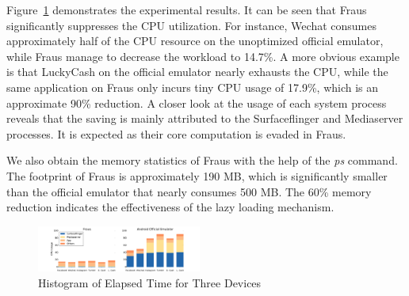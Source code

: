 \documentclass[conference]{IEEEtranl}
\begin{document}
	Figure~\ref{fig:cpusaving} demonstrates the experimental results. It can be seen that 
	Fraus significantly suppresses the CPU utilization. For instance, Wechat consumes approximately half of the CPU resource on the unoptimized official emulator, while Fraus manage to decrease the workload to 14.7\%. A more obvious example is that LuckyCash on the official emulator nearly exhausts the CPU, while the same application on Fraus only incurs tiny CPU usage of 17.9\%, which is an approximate 90\% reduction. A closer look at the usage of each system process reveals that the saving is mainly attributed to the Surfaceflinger and Mediaserver processes. It is expected as their core computation is evaded in Fraus.

	 
	We also obtain the memory statistics of Fraus with the help of the \textit{ps} command. The footprint of Fraus is approximately 190 MB, which is significantly smaller than the official emulator that nearly consumes 500 MB. The 60\% memory reduction indicates the effectiveness of the lazy loading mechanism. 


	\begin{figure}[tb]
	\begin{center}
	\includegraphics[width=0.48\textwidth]{Figures/cpusaving}
	\caption{Histogram of Elapsed Time for Three Devices}
	\label{fig:cpusaving}
	\vspace{-0.3in}
	\end{center}
	\end{figure}





\end{document}
